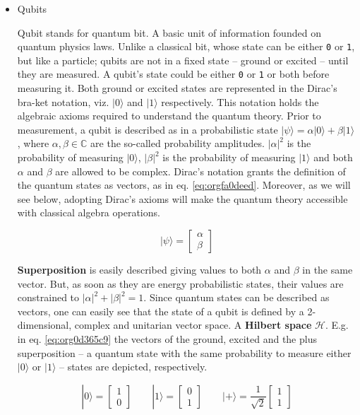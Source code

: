 \begin{itemize}
\item Qubits
\label{sec:orge2e7003}

Qubit stands for quantum bit.
A basic unit of information founded on quantum physics laws.
Unlike a classical bit, whose state can be either \texttt{0} or \texttt{1}, but like a particle; qubits are not in a fixed state -- ground or excited -- until they are measured.
A qubit's state could be either \texttt{0} or \texttt{1} or both before measuring it.
Both ground or excited states are represented in the Dirac's bra-ket notation, viz. \(| 0 \rangle\) and \(| 1 \rangle\) respectively.
This notation holds the algebraic axioms \cite{Nielsen_2009} required to understand the quantum theory.
Prior to measurement, a qubit is described as in a probabilistic state \(| \psi \rangle = \alpha | 0 \rangle + \beta | 1 \rangle\), where \(\alpha, \beta \in \mathbb{C}\) are the so-called probability amplitudes.
\(|\alpha|^2\) is the probability of measuring \(| 0 \rangle\), \(|\beta|^2\) is the probability of measuring \(| 1 \rangle\) and both \(\alpha\) and \(\beta\) are allowed to be complex.
Dirac's notation grants the definition of the quantum states as vectors, as in eq. \ref{eq:orgfa0deed}.
Moreover, as we will see below, adopting Dirac's axioms will make the quantum theory accessible with classical algebra operations. 

\begin{equation}
\label{eq:orgfa0deed}
|\psi\rangle = \begin{bmatrix}\alpha \\ \beta \end{bmatrix}
\end{equation}

\textbf{Superposition} is easily described giving values to both \(\alpha\) and \(\beta\) in the same vector.
But, as soon as they are energy probabilistic states, their values are constrained to \(|\alpha|^2 + |\beta|^2 = 1\).
Since quantum states can be described as vectors, one can easily see that the state of a qubit is defined by a 2-dimensional, complex and unitarian vector space.
A \textbf{Hilbert space} \(\mathscr{H}\).
E.g. in eq. \ref{eq:org0d365c9} the vectors of the ground, excited and the plus superposition -- a quantum state with the same probability to measure either \(|0\rangle\) or \(|1\rangle\) -- states are depicted, respectively.

\begin{equation}
\label{eq:org0d365c9}
|0\rangle = \begin{bmatrix}1 \\ 0 \end{bmatrix} \quad \quad |1\rangle = \begin{bmatrix}0 \\ 1 \end{bmatrix} \quad \quad |+\rangle = \frac{1}{\sqrt{2}} \begin{bmatrix}1 \\ 1 \end{bmatrix}
\end{equation}


\end{itemize}
